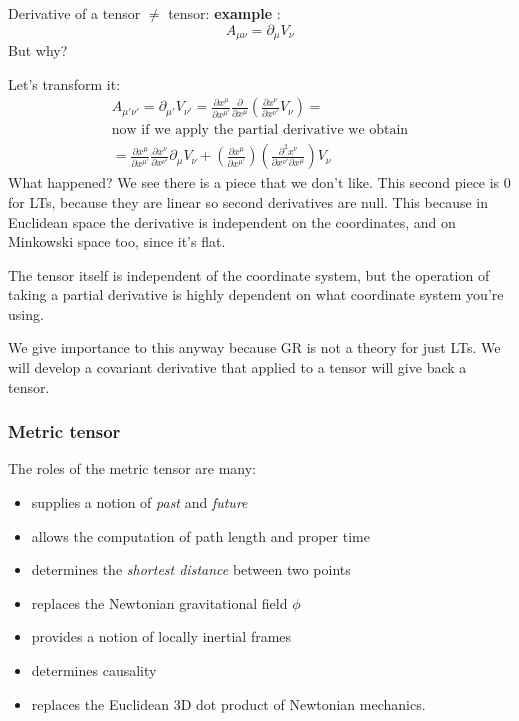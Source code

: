 Derivative of a tensor $\neq$ tensor:
\textbf{example} : 
\[
A_{\mu \nu } = \partial_{\mu }V_{\nu }
\]
But why? \par
Let's transform it:
\begin{gather*}
A_{\mu '\nu '} = \partial_{\mu '}V_{\nu '} = \frac{\partial x^{\mu }}{\partial x^{\mu '}} \frac{\partial }{\partial x^{\mu }} \left( \frac{\partial x^{\nu }}{\partial x^{\nu '}}V_{\nu }  \right) = \\
\text{now if we apply the partial derivative we obtain}\\
= \frac{\partial x^{\mu }}{\partial x^{\mu '}} \frac{\partial x^{\nu }}{\partial x^{\nu '}} \partial_{\mu } V_{\nu } + \left( \frac{\partial x^{\mu }}{\partial x^{\mu '}}  \right)\left( \frac{\partial^{2}x^{\nu }}{\partial x^{\nu '}\partial x^{\mu }}  \right)V_{\nu }
\end{gather*}
What happened? We see there is a piece that we don't like. This second piece is 0 for LTs, because they are linear so second derivatives are null. This because in Euclidean space the derivative is independent on the coordinates, and on Minkowski space too, since it's flat. \par
The tensor itself is independent of the coordinate system, but the operation of taking a partial derivative is highly dependent on what coordinate system you're using.\par
We give importance to this anyway because GR is not a theory for just LTs.
We will develop a covariant derivative that applied to a tensor will give back a tensor.

\subsubsection{Metric tensor}
The roles of the metric tensor are many:
\begin{itemize}
	\item supplies a notion of \emph{past} and \emph{future}
	\item allows the computation of path length and proper time
	\item determines the \emph{shortest distance} between two points
	\item replaces the Newtonian gravitational field $\phi $
	\item provides a notion of locally inertial frames
	\item determines causality
	\item replaces the Euclidean 3D dot product of Newtonian mechanics.
\end{itemize}

